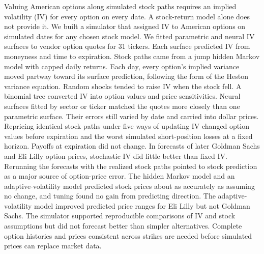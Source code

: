 Valuing American options along simulated stock paths requires an implied volatility (IV) for every option on every date. A stock-return model alone does not provide it. We built a simulator that assigned IV to American options on simulated dates for any chosen stock model. We fitted parametric and neural IV surfaces to vendor option quotes for 31 tickers. Each surface predicted IV from moneyness and time to expiration. Stock paths came from a jump hidden Markov model with capped daily returns. Each day, every option's implied variance moved partway toward its surface prediction, following the form of the Heston variance equation. Random shocks tended to raise IV when the stock fell. A binomial tree converted IV into option values and price sensitivities. Neural surfaces fitted by sector or ticker matched the quotes more closely than one parametric surface. Their errors still varied by date and carried into dollar prices. Repricing identical stock paths under five ways of updating IV changed option values before expiration and the worst simulated short-position losses at a fixed horizon. Payoffs at expiration did not change. In forecasts of later Goldman Sachs and Eli Lilly option prices, stochastic IV did little better than fixed IV. Rerunning the forecasts with the realized stock paths pointed to stock prediction as a major source of option-price error. The hidden Markov model and an adaptive-volatility model predicted stock prices about as accurately as assuming no change, and tuning found no gain from predicting direction. The adaptive-volatility model improved predicted price ranges for Eli Lilly but not Goldman Sachs. The simulator supported reproducible comparisons of IV and stock assumptions but did not forecast better than simpler alternatives. Complete option histories and prices consistent across strikes are needed before simulated prices can replace market data.
